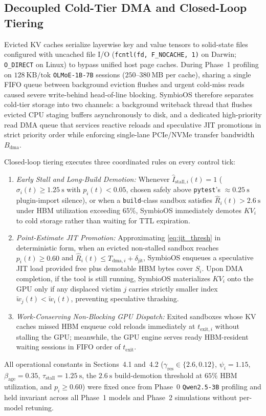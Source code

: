 \documentclass[10pt,journal,compsoc]{IEEEtran}
\theoremstyle{definition}
\theoremstyle{remark}
\newcommand{\SymbioOS}{\textup{\textsc{SymbioOS}}}
\def\SymbioOS{SymbioOS}%
\begin{document}
\subsection{Decoupled Cold-Tier DMA and Closed-Loop Tiering}
Evicted KV caches serialize layerwise key and value tensors to solid-state files configured with uncached file I/O (\texttt{fcntl(fd, F\_NOCACHE, 1)} on Darwin; \texttt{O\_DIRECT} on Linux) to bypass unified host page caches. During Phase~1 profiling on $128~\mathrm{KB/tok}$ \texttt{OLMoE-1B-7B} sessions ($250$--$380~\mathrm{MB}$ per cache), sharing a single FIFO queue between background eviction flushes and urgent cold-miss reads caused severe write-behind head-of-line blocking. \SymbioOS{} therefore separates cold-tier storage into two channels: a background writeback thread that flushes evicted CPU staging buffers asynchronously to disk, and a dedicated high-priority read DMA queue that services reactive reloads and speculative JIT promotions in strict priority order while enforcing single-lane PCIe/NVMe transfer bandwidth $B_{\mathrm{dma}}$.

Closed-loop tiering executes three coordinated rules on every control tick:
\begin{enumerate}
\item \emph{Early Stall and Long-Build Demotion:} Whenever $\hat{I}_{\mathrm{stall},i}(t) = 1$ ($\sigma_i(t) \ge 1.25~\mathrm{s}$ with $p_i(t) < 0.05$, chosen safely above \texttt{pytest}'s $\approx 0.25~\mathrm{s}$ plugin-import silence), or when a \texttt{build}-class sandbox satisfies $\hat{R}_i(t) > 2.6~\mathrm{s}$ under HBM utilization exceeding $65\%$, \SymbioOS{} immediately demotes $KV_i$ to cold storage rather than waiting for TTL expiration.
\item \emph{Point-Estimate JIT Promotion:} Approximating \eqref{eq:jit_thresh} in deterministic form, when an evicted non-stalled sandbox reaches $p_i(t) \ge 0.60$ and $\hat{R}_i(t) \le T_{\mathrm{dma},i} + \delta_{\mathrm{jit}}$, \SymbioOS{} enqueues a speculative JIT load provided free plus demotable HBM bytes cover $S_i$. Upon DMA completion, if the tool is still running, \SymbioOS{} materializes $KV_i$ onto the GPU only if any displaced victim $j$ carries strictly smaller index $\tilde{w}_j(t) < \tilde{w}_i(t)$, preventing speculative thrashing.
\item \emph{Work-Conserving Non-Blocking GPU Dispatch:} Exited sandboxes whose KV caches missed HBM enqueue cold reloads immediately at $t_{\mathrm{exit},i}$ without stalling the GPU; meanwhile, the GPU engine serves ready HBM-resident waiting sessions in FIFO order of $t_{\mathrm{exit}}$.
\end{enumerate}
All operational constants in Sections~4.1 and~4.2 ($\gamma_{\mathrm{res}} \in \{2.6, 0.12\}$, $\psi_i = 1.15$, $\beta_{\mathrm{age}} = 0.35$, $\tau_{\mathrm{stall}} = 1.25~\mathrm{s}$, the $2.6~\mathrm{s}$ build-demotion threshold at $65\%$ HBM utilization, and $p_i \ge 0.60$) were fixed once from Phase~0 \texttt{Qwen2.5-3B} profiling and held invariant across all Phase~1 models and Phase~2 simulations without per-model retuning.
\end{document}

